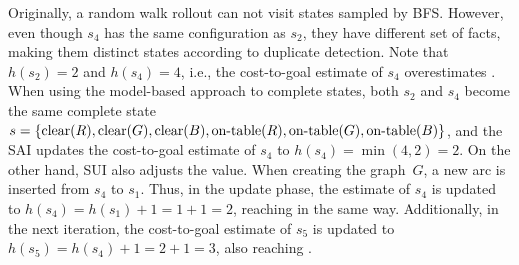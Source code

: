 Originally, a random walk rollout can not visit states sampled by BFS. However, even though $s_4$ has the same configuration as $s_2$, they have different set of facts, making them distinct states according to duplicate detection. Note that $h(s_2)=2$ and $h(s_4)=4$, i.e., the cost-to-goal estimate of $s_4$ overestimates \hstar. When using the model-based approach to complete states, both $s_2$ and $s_4$ become the same complete state $s = \{\text{clear}(R),\text{clear}(G),\text{clear}(B),\text{on-table}(R),\text{on-table}(G),\text{on-table}(B)\}$, and the SAI updates the cost-to-goal estimate of $s_4$ to $h(s_4)=\min(4,2)=2$. On the other hand, SUI also adjusts the value. When creating the graph~$G$, a new arc is inserted from $s_4$ to $s_1$. Thus, in the update phase, the estimate of $s_4$ is updated to $h(s_4)=h(s_1)+1=1+1=2$, reaching \hstar in the same way. Additionally, in the next iteration, the cost-to-goal estimate of $s_5$ is updated to $h(s_5)=h(s_4)+1=2+1=3$, also reaching \hstar.
